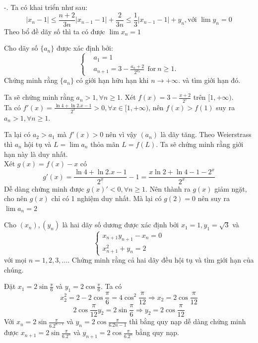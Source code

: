 \documentclass[11pt]{scrartcl}
\begin{document}
\begin{itemize}[label=, leftmargin=0em, itemsep=0.5em]
\begin{sol}
        -.
         Ta có khai triển như sau:
        \[|x_n  - 1| \leq \frac{n + 2}{3n}\left|x_{n-1} - 1\right| + \frac{2}{3n} \leq \frac{1}{3}|x_{n -1 } - 1| + y_n, \text{với } \lim y_n = 0\]
        Theo bổ đề dãy số thì ta có được $\lim x_n = 1$
    \end{sol}
    \vspace{1em}
    \begin{bt}
        Cho dãy số $\{a_n\}$ được xác định bởi: $$\left\{\begin{aligned}& a_1=1 \\ & a_{n+1}=3-\frac{a_{n}+2}{2^{a_{n}}}\ \ \text{for} \ n\geq 1.\end{aligned}\right.$$
        Chứng minh rằng $\{a_n\}$ có giới hạn hữu hạn khi $n\to+\infty.$ và tìm giới hạn đó.
    \end{bt}

    \begin{sol}
        Ta sẽ chứng minh rằng $a_n > 1, \forall n \geq 1$. Xét $f(x) = 3 - \frac{x + 2}{2^x}$ trên $[1,+\infty)$.\\ Ta có $f'(x) = \frac{\ln4 + \ln2. x - 1}{2^x} > 0, \forall x \in [1,+\infty)$, nên $f(x) > f(1)$ suy ra $a_n > 1, \forall n \geq 1$. 


        Ta lại có $a_2 > a_1$ mà $f'(x) > 0$ nên vì vậy $(a_n)$ là dãy tăng. Theo Weierstrass thì $a_n$ hội tụ và $L = \lim a_n$ thỏa mãn $L = f(L)$. Ta sẽ chứng minh rằng giới hạn này là duy nhất.\\
        Xét $g(x) = f(x) - x$ có $$g'(x) = \frac{\ln4 + \ln2. x - 1}{2^x} - 1 = \frac{x\ln2 + \ln4 - 1 - 2^x}{2^x}$$
        Dễ dàng chứng minh được $g(x)' < 0, \forall n \geq 1$. Nên thành ra $g(x)$ giảm ngặt, cho nên $g(x)$ chỉ có 1 nghiệm duy nhất. Mà lại có $g(2) = 0$ nên suy ra $\lim a_n = 2$
    \end{sol}
    \begin{bt}
        Cho $({{x}_{n}}),({{y}_{n}})$ là hai dãy số dương được xác định bởi ${{x}_{1}}=1,{{y}_{1}}=\sqrt{3}$ và
        \[ \begin{cases} {{x}_{n+1}}{{y}_{n+1}}-{{x}_{n}}=0 \\ x_{n+1}^{2}+{{y}_{n}}=2 \end{cases} \] với mọi $n=1,2,3,\ldots$.
Chứng minh rằng cả hai dãy đều hội tụ và tìm giới hạn của chúng.
    \end{bt}

    \begin{sol}
        Đặt $x_1 = 2\sin{\frac{\pi}{6}}$ và $y_1 = 2\cos{\frac{\pi}{6}}$. Ta có 
        $$x_2^2 = 2 - 2\cos{\frac{\pi}{6}} = 4\cos^2{\frac{\pi}{12}} \Rightarrow x_2 = 2\cos{\frac{\pi}{12}}$$
        $$2\cos{\frac{\pi}{12}}y_2 =  2\sin{\frac{\pi}{6}} \Rightarrow y_2 = 2\cos{\frac{\pi}{12}}$$
        Với  $x_n = 2\sin{\frac{\pi}{6.2^{n-1}}}$ và $y_n = 2\cos{\frac{\pi}{6.2{n-1}}}$ thì bằng quy nạp dễ dàng chứng minh được $x_{n+1} = 2\sin{\frac{\pi}{6.2^{n}}}$ và $y_{n+1} = 2\cos{\frac{\pi}{6.2^{n}}}$ bằng quy nạp. 



\end{sol}
\end{itemize}
\end{document}
